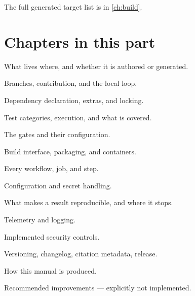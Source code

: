 The full generated target list is in \cref{ch:build}.

\section{Chapters in this part}

\begin{description}[nosep]
  \item[\cref{ch:repository-structure}] What lives where, and whether it is
    authored or generated.
  \item[\cref{ch:development-workflow}] Branches, contribution, and the local
    loop.
  \item[\cref{ch:dependency-engineering}] Dependency declaration, extras, and
    locking.
  \item[\cref{ch:testing}] Test categories, execution, and what is covered.
  \item[\cref{ch:quality-assurance}] The gates and their configuration.
  \item[\cref{ch:build}] Build interface, packaging, and containers.
  \item[\cref{ch:ci-cd}] Every workflow, job, and step.
  \item[\cref{ch:configuration-management}] Configuration and secret handling.
  \item[\cref{ch:reproducibility}] What makes a result reproducible, and where
    it stops.
  \item[\cref{ch:observability}] Telemetry and logging.
  \item[\cref{ch:security}] Implemented security controls.
  \item[\cref{ch:releases}] Versioning, changelog, citation metadata, release.
  \item[\cref{ch:documentation-system}] How this manual is produced.
  \item[\cref{ch:improvements}] Recommended improvements --- explicitly not
    implemented.
\end{description}















